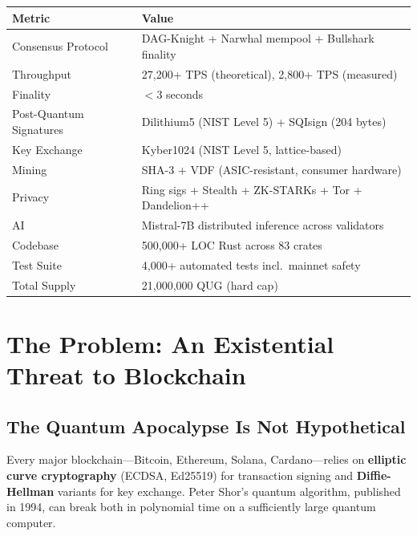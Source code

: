 \documentclass[11pt,a4paper]{article}
\begin{document}
\begin{center}
\begin{tabular}{@{}p{5.5cm}p{9cm}@{}}
\toprule
\textbf{Metric} & \textbf{Value} \\
\midrule
Consensus Protocol & DAG-Knight + Narwhal mempool + Bullshark finality \\
Throughput & 27,200+ TPS (theoretical), 2,800+ TPS (measured) \\
Finality & $<3$ seconds \\
Post-Quantum Signatures & Dilithium5 (NIST Level 5) + SQIsign (204 bytes) \\
Key Exchange & Kyber1024 (NIST Level 5, lattice-based) \\
Mining & SHA-3 + VDF (ASIC-resistant, consumer hardware) \\
Privacy & Ring sigs + Stealth + ZK-STARKs + Tor + Dandelion++ \\
AI & Mistral-7B distributed inference across validators \\
Codebase & 500,000+ LOC Rust across 83 crates \\
Test Suite & 4,000+ automated tests incl.\ mainnet safety \\
Total Supply & 21,000,000 QUG (hard cap) \\
\bottomrule
\end{tabular}
\end{center}

\section{The Problem: An Existential Threat to Blockchain}

\subsection{The Quantum Apocalypse Is Not Hypothetical}

Every major blockchain---Bitcoin, Ethereum, Solana, Cardano---relies on \textbf{elliptic curve cryptography} (ECDSA, Ed25519) for transaction signing and \textbf{Diffie-Hellman} variants for key exchange. Peter Shor's quantum algorithm, published in 1994, can break both in polynomial time on a sufficiently large quantum computer.
\end{document}
